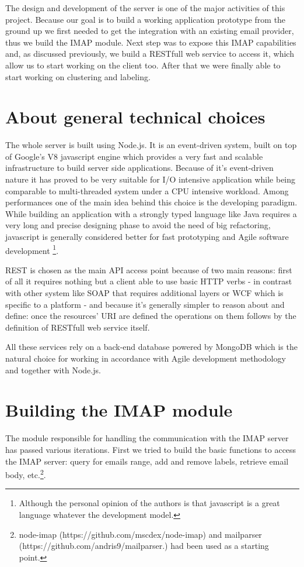 \documentclass[a4paper,12pt]{report}
\begin{document}
The design and development of the server is one of the major activities of this project. Because our goal is to build a working application prototype from the ground up we first needed to get the integration with an existing email provider, thus we build the IMAP module. Next step was to expose this IMAP capabilities and, as discussed previously, we build a RESTfull web service to access it, which allow us to start working on the client too. After that we were finally able to start working on clustering and labeling.

\section{About general technical choices}
The whole server is built using Node.js. It is an event-driven system, built on top of Google's V8 javascript engine which provides a very fast and scalable infrastructure to build server side applications. Because of it's event-driven nature it has proved to be very suitable for I/O intensive application while being comparable to multi-threaded system under a CPU intensive workload. Among performances one of the main idea behind this choice is the developing paradigm. While building an application with a strongly typed language like Java requires a very long and precise designing phase to avoid the need of big refactoring, javascript is generally considered better for fast prototyping and Agile software development \footnote{Although the personal opinion of the authors is that javascript is a great language whatever the development model.}.

REST is chosen as the main API access point because of two main reasons: first of all it requires nothing but a client able to use basic HTTP verbs - in contrast with other system like SOAP that requires additional layers or WCF which is specific to a platform - and because it's generally simpler to reason about and define: once the resources' URI are defined the operations on them follows by the definition of RESTfull web service itself. 

All these services rely on a back-end database powered by MongoDB which is the natural choice for working in accordance with Agile development methodology and together with Node.js.

\section{Building the IMAP module}
The module responsible for handling the communication with the IMAP server has passed various iterations.
First we tried to build the basic functions to access the IMAP server: query for emails range, add and remove labels, retrieve email body, etc.\footnote{node-imap (https://github.com/mscdex/node-imap) and mailparser (https://github.com/andris9/mailparser.) had been used as a starting point.}. 
\end{document}

